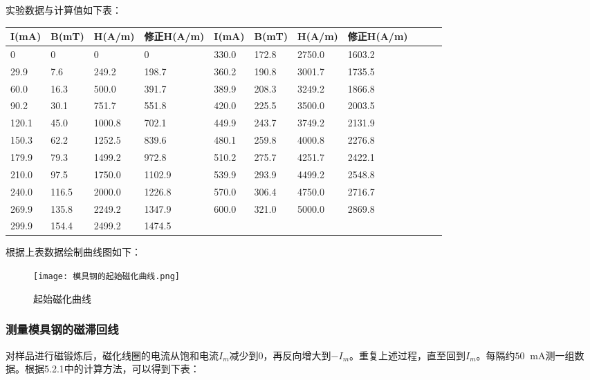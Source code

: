 \documentclass[11pt]{article}
\newcommand*{\unit}[1]{\mathop{}\!\mathrm{#1}}
\begin{document}
实验数据与计算值如下表：

\begin{table}[H]
    \centering
    \begin{tabular}{|l|l|l|l|l|l|l|l|l|l|l|}
        \hline
        I(mA) & B(mT) & H(A/m) & 修正H(A/m) &I(mA) & B(mT) & H(A/m) & 修正H(A/m) \\ \hline
        0     & 0     & 0     & 0     & 330.0  & 172.8  & 2750.0  & 1603.2   \\ \hline
        29.9  & 7.6   & 249.2  & 198.7  & 360.2  & 190.8  & 3001.7  & 1735.5  \\ \hline
        60.0  & 16.3  & 500.0  & 391.7  & 389.9  & 208.3  & 3249.2  & 1866.8 \\ \hline
        90.2  & 30.1  & 751.7  & 551.8  & 420.0  & 225.5  & 3500.0  & 2003.5  \\ \hline
        120.1  & 45.0  & 1000.8  & 702.1  & 449.9  & 243.7  & 3749.2  & 2131.9  \\ \hline
        150.3  & 62.2  & 1252.5  & 839.6  & 480.1  & 259.8  & 4000.8  & 2276.8 \\ \hline
        179.9  & 79.3  & 1499.2  & 972.8  & 510.2  & 275.7  & 4251.7  & 2422.1  \\ \hline
        210.0  & 97.5  & 1750.0  & 1102.9  & 539.9  & 293.9  & 4499.2  & 2548.8  \\ \hline
        240.0  & 116.5  & 2000.0  & 1226.8  & 570.0  & 306.4  & 4750.0  & 2716.7  \\ \hline
        269.9  & 135.8  & 2249.2  & 1347.9  & 600.0  & 321.0  & 5000.0  & 2869.8  \\ \hline
        299.9  & 154.4  & 2499.2  & 1474.5  &       &       &       &  \\ \hline
    \end{tabular}
\end{table}

根据上表数据绘制曲线图如下：

\begin{figure}[H]
    \centering
    \texttt{[image: 模具钢的起始磁化曲线.png]}
    \caption{起始磁化曲线}
\end{figure}

\subsubsection{测量模具钢的磁滞回线}

对样品进行磁锻炼后，磁化线圈的电流从饱和电流$I_m$减少到0，再反向增大到$-I_m$。重复上述过程，直至回到$I_m$。每隔约$50\unit{mA}$测一组数据。根据5.2.1中的计算方法，可以得到下表：
\end{document}
